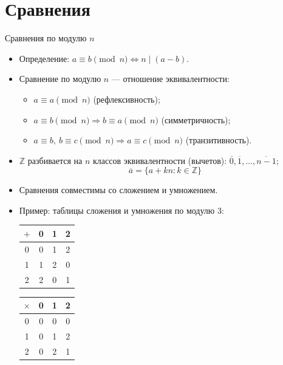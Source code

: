 \documentclass[serif, aspectratio=169]{beamer}
\begin{document}
\section{Сравнения}

\begin{frame}{Сравнения по модулю $n$}
    \begin{itemize}
        \item Определение: $a \equiv b \pmod n \iff n \mid (a-b)$.
        \item Сравнение по модулю $n$ --- отношение эквивалентности:
        \begin{itemize}
            \item $a\equiv a\pmod n$ (рефлексивность);
            \item $a\equiv b\pmod n \Rightarrow b\equiv a\pmod n$ (симметричность);
            \item $a\equiv b,\ b\equiv c\pmod n \Rightarrow a\equiv c\pmod n$ (транзитивность).
        \end{itemize}
        \item $\mathbb{Z}$ разбивается на $n$ классов эквивалентности (вычетов): $\overline{0}, \overline{1}, \dots, \overline{n-1}$;
        \[\overline{a} = \{a + kn: k\in\mathbb{Z}\}\] 
        \item Сравнения совместимы со сложением и умножением.
        \item Пример: таблицы сложения и умножения по модулю $3$:
        \begin{center}
            \begin{tabular}{c|ccc}
                $+$ & 0 & 1 & 2 \\
                \hline
                0 & 0 & 1 & 2 \\
                1 & 1 & 2 & 0 \\
                2 & 2 & 0 & 1 \\
            \end{tabular}
            \hspace{3em}
            \begin{tabular}{c|ccc}
                $\times$ & 0 & 1 & 2 \\
                \hline
                0 & 0 & 0 & 0 \\
                1 & 0 & 1 & 2 \\
                2 & 0 & 2 & 1 \\
            \end{tabular}
        \end{center}
    \end{itemize}
\end{frame}
\end{document}
